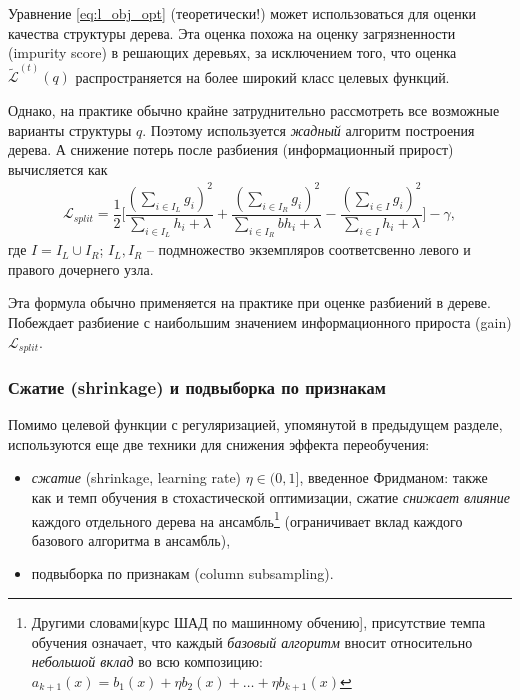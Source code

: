 \documentclass[%
	11pt,
	a4paper,
	utf8,
		]{article}
\begin{document}
Уравнение \eqref{eq:l_obj_opt} ({\color{red}теоретически!}) может использоваться для оценки качества структуры дерева. Эта оценка похожа на оценку загрязненности (impurity score) в решающих деревьях, за исключением того, что оценка $ \tilde{\mathcal{L}}^{(t)}(q) $ распространяется на более широкий класс целевых функций.

Однако, на практике обычно крайне затруднительно рассмотреть все возможные варианты структуры $ q $. Поэтому используется \emph{жадный} алгоритм построения дерева. А снижение потерь после разбиения (информационный прирост) вычисляется как
\begin{align*}
	\mathcal{L}_{split} = \dfrac{1}{2} \Big[ \dfrac{ (\sum_{i \in I_L} g_i)^2 }{ \sum_{ i \in I_L } h_i + \lambda } + \dfrac{ (\sum_{i \in I_R} g_i)^2 }{ \sum_{i \in I_R}b h_i + \lambda } - \dfrac{ (\sum_{ i \in I } g_i)^2 }{ \sum_{i \in I} h_i + \lambda } \Big] - \gamma,
\end{align*}
где $ I = I_L \cup I_R $; $ I_L, I_R $ -- подмножество экземпляров соответсвенно левого и правого дочернего узла.

Эта формула обычно применяется на практике при оценке разбиений в дереве. Побеждает разбиение с наибольшим значением информационного прироста (gain) $ \mathcal{L}_{split} $.

\subsubsection{Сжатие (shrinkage) и подвыборка по признакам}

Помимо целевой функции с регуляризацией, упомянутой в предыдущем разделе, используются еще две техники для снижения эффекта переобучения:
\begin{itemize}
	\item \emph{сжатие} (shrinkage, learning rate) $ \eta \in (0, 1] $, введенное Фридманом: также как и темп обучения в стохастической оптимизации, сжатие \emph{снижает влияние} каждого отдельного дерева на ансамбль\footnote{Другими словами[курс ШАД по машинному обчению], присутствие темпа обучения означает, что каждый \emph{базовый алгоритм} вносит относительно \emph{небольшой вклад} во всю композицию: $ a_{k + 1}(x) = b_1(x) + \eta b_2(x) + \ldots + \eta b_{k + 1}(x) $} (ограничивает вклад каждого базового алгоритма в ансамбль),
	
	\item подвыборка по признакам (column subsampling).
\end{itemize}
\end{document}
